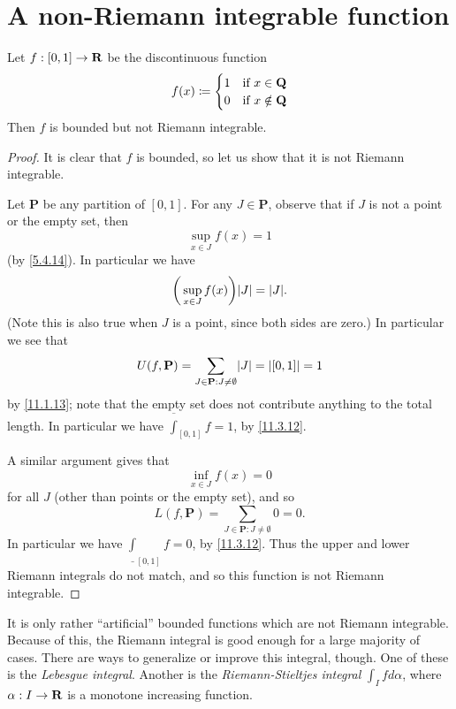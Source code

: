 \section{A non-Riemann integrable function}\label{sec 11.7}

\begin{proposition}\label{11.7.1}
  Let \(f : [0, 1] \to \mathbf{R}\) be the discontinuous function
  \[
    f(x) \coloneqq \begin{cases}
      1 & \text{if } x \in \mathbf{Q}    \\
      0 & \text{if } x \notin \mathbf{Q}
    \end{cases}
  \]
  Then \(f\) is bounded but not Riemann integrable.
\end{proposition}

\begin{proof}
  It is clear that \(f\) is bounded, so let us show that it is not Riemann integrable.

  Let \(\mathbf{P}\) be any partition of \([0, 1]\).
  For any \(J \in \mathbf{P}\), observe that if \(J\) is not a point or the empty set, then
  \[
    \sup_{x \in J} f(x) = 1
  \]
  (by \cref{5.4.14}).
  In particular we have
  \[
    \bigg(\sup_{x \in J} f(x)\bigg) \abs{J} = \abs{J}.
  \]
  (Note this is also true when \(J\) is a point, since both sides are zero.)
  In particular we see that
  \[
    U(f, \mathbf{P}) = \sum_{J \in \mathbf{P} : J \neq \emptyset} \abs{J} = \abs{[0, 1]} = 1
  \]
  by \cref{11.1.13};
  note that the empty set does not contribute anything to the total length.
  In particular we have \(\overline{\int}_{[0, 1]} f = 1\), by \cref{11.3.12}.

  A similar argument gives that
  \[
    \inf_{x \in J} f(x) = 0
  \]
  for all \(J\) (other than points or the empty set), and so
  \[
    L(f, \mathbf{P}) = \sum_{J \in \mathbf{P} : J \neq \emptyset} 0 = 0.
  \]
  In particular we have \(\underline{\int}_{[0, 1]} f = 0\), by \cref{11.3.12}.
  Thus the upper and lower Riemann integrals do not match, and so this function is not Riemann integrable.
\end{proof}

\begin{remark}\label{11.7.2}
  It is only rather ``artificial'' bounded functions which are not Riemann integrable.
  Because of this, the Riemann integral is good enough for a large majority of cases.
  There are ways to generalize or improve this integral, though.
  One of these is the \emph{Lebesgue integral}.
  Another is the \emph{Riemann-Stieltjes integral} \(\int_I f d\alpha\), where \(\alpha : I \to \mathbf{R}\) is a monotone increasing function.
\end{remark}